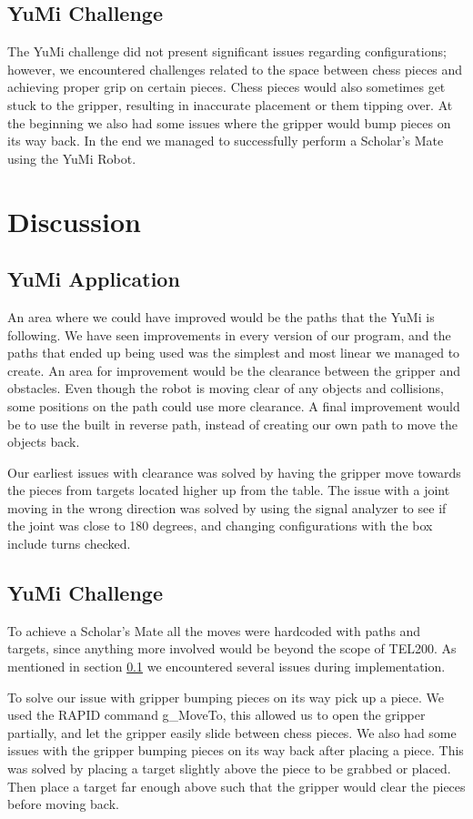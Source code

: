 \documentclass[a4paper,12pt]{article}
\begin{document}
\subsection{YuMi Challenge}
\label{sec:YuMi_challenge_results}
The YuMi challenge did not present significant issues regarding configurations; however, we encountered challenges related to the space between chess pieces and achieving proper grip on certain pieces. Chess pieces would also sometimes get stuck to the gripper, resulting in inaccurate placement or them tipping over. At the beginning we also had some issues where the gripper would bump pieces on its way back. In the end we managed to successfully perform a Scholar's Mate using the YuMi Robot.

\section{Discussion}
\subsection{YuMi Application}
An area where we could have improved would be the paths that the YuMi is following. We have seen improvements in every version of our program, and the paths that ended up being used was the simplest and most linear we managed to create. An area for improvement would be the clearance between the gripper and obstacles. Even though the robot is moving clear of any objects and collisions, some positions on the path could use more clearance. A final improvement would be to use the built in reverse path, instead of creating our own path to move the objects back.

Our earliest issues with clearance was solved by having the gripper move towards the pieces from targets located higher up from the table. The issue with a joint moving in the wrong direction was solved by using the signal analyzer to see if the joint was close to 180 degrees, and changing configurations with the box include turns checked.
\subsection{YuMi Challenge}
To achieve a Scholar's Mate all the moves were hardcoded with paths and targets, since anything more involved would be beyond the scope of TEL200. As mentioned in section \ref{sec:YuMi_challenge_results} we encountered several issues during implementation. 

To solve our issue with gripper bumping pieces on its way pick up a piece. We used the RAPID command g\_MoveTo, this allowed us to open the gripper partially, and let the gripper easily slide between chess pieces. We also had some issues with the gripper bumping pieces on its way back after placing a piece. This was solved by placing a target slightly above the piece to be grabbed or placed. Then place a target far enough above such that the gripper would clear the pieces before moving back.
\end{document}
